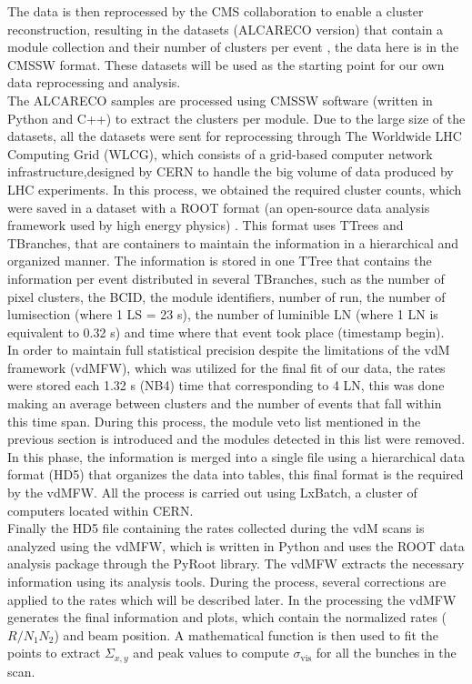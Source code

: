 The data is then reprocessed by the CMS collaboration to enable a cluster reconstruction, resulting in the datasets (ALCARECO version) that contain a module collection and their number of clusters per event , the data here is in the CMSSW format. These datasets will be used as the starting point for our own data reprocessing and analysis.\\

The ALCARECO samples are processed using CMSSW software (written in Python and C++) to extract the clusters per module. Due to the large size of the datasets, all the datasets were sent for reprocessing through The Worldwide LHC Computing Grid (WLCG), which consists of a grid-based computer network infrastructure,designed by CERN to handle the big volume of data produced by LHC experiments. In this  process, we obtained the required cluster counts, which were saved in a dataset with a ROOT format (an open-source data analysis framework used by high energy physics) \cite{ROOT}. This format uses TTrees and TBranches, that are containers to maintain the information in a hierarchical and organized manner. 
The information is stored in one TTree that contains the information per event distributed in several TBranches, such as the number of pixel clusters, the BCID, the module identifiers, number of run, the number of lumisection (where 1 LS = 23 s), the number of luminible LN (where 1 LN is equivalent to 0.32 s) and time where that event took place (timestamp begin).\\

In order to maintain full statistical precision despite the limitations of the vdM framework (vdMFW), which was utilized for the final fit of our data, the rates were stored  each 1.32 s (NB4) time that corresponding to 4 LN, this was done making  an average  between clusters and the number of events that fall within this time span. During this process, the module veto list mentioned in the previous section is introduced and the modules detected in this list were removed. In this phase, the information is merged into a single file using a hierarchical data format (HD5) \cite{HD5} that organizes the data into tables, this final format is the required by the vdMFW. All the  process is carried out using LxBatch, a cluster of computers located within CERN.\\

Finally the HD5 file containing the rates collected during the vdM scans  is analyzed using the vdMFW, which is written in Python and uses the ROOT data analysis package through the PyRoot \cite{PyROOT} library. The vdMFW  extracts the necessary information using its analysis tools. During the process, several corrections are applied to the rates which will be described later. In the processing the vdMFW generates the final information and plots, which contain the normalized rates ($R/N_{1}N_{2}$) and beam position.  A mathematical function is then used to fit the points to extract $\Sigma_{x,y}$ and peak values to compute $\sigma_{\text{vis}}$ for all the bunches in the scan.

